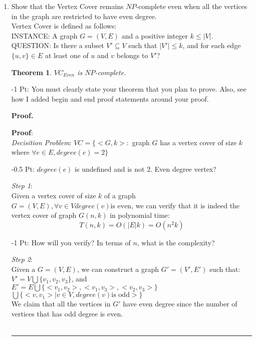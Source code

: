 \documentclass{article}%
\newtheorem{theorem}{Theorem}
\newenvironment{proof}[1][Proof]{\textbf{#1.} }{\ \rule{0.5em}{0.5em}}
\newcommand{\add}[1]{\textcolor{dkgreen}{#1}}
\begin{document}
\begin{enumerate}


  \item Show that the Vertex Cover remains $NP$-complete even when all the vertices in the graph 	are restricted to have even degree.\\
  Vertex Cover is defined as follows:\\
  INSTANCE: A graph $G=(V,E)$ and a positive integer $k \leq |V|$.\\
  QUESTION: Is there a subset $V' \subseteq V$ such that $|V'| \leq k$, and for each edge $\{u,v\} \in E$ at least one of $u$ and $v$ belongs to $V'$?
  
  \add{
		\begin{theorem}
		$VC_{Even}$ is $NP$-complete.
		\end{theorem}
		}
		
		\add{-1 Pt: You must clearly state your theorem that you plan to prove. Also, see how I added begin and end proof statements around your proof.}
		
\begin{proof}
  
  \textbf{Proof}:\\
  \emph{Decisition Problem}: $VC=\{<G,k>:$ graph $G$ has a vertex cover of size $k$ where $\forall e \in E, degree(e) = 2\}$
  
  \add{-0.5 Pt: $degree(e)$ is undefined and is not 2. Even degree vertex?}
  
  \emph{Step 1}:\\
  Given a vertex cover of size $k$ of a graph $G=(V,E),\forall v \in V degree(v) \text{is even}$, we can verify that it is indeed the vertex cover of graph $G(n,k)$ in polynomial time:\\
  $$T(n,k)=O(|E|k)=O(n^{2}k)$$
  
  \add{-1 Pt: How will you verify? In terms of $n$, what is the complexity?}
  
   \emph{Step 2}:\\
  Given a $G=(V,E)$, we can construct a graph $G'=(V',E')$ such that:\\
  $V' = V \bigcup \{v_{1},v_{2},v_{3}\}$, and \\
  $E' = E \bigcup \{<v_{1},v_{2}>,<v_{1},v_{3}>,<v_{2},v_{3}>\}$ $\bigcup \{<v,v_{1}>|v \in V, degree(v) \text{is odd}>\}$ \\
  
  We claim that all the vertices in $G'$ have even degree since the number of vertices that has odd degree is even. \\
  

\end{proof}
\end{enumerate}
\end{document}
